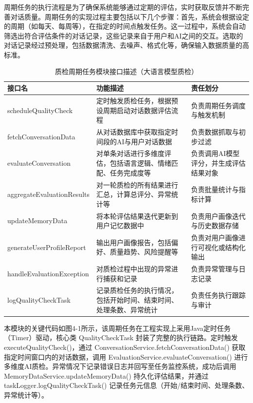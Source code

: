 周期任务的执行流程是为了确保系统能够通过定期的评估，实时获取反馈并不断完善对话质量。周期任务的实现过程主要包括以下几个步骤：首先，系统会根据设定的周期（如每天、每周等），在指定的时间点触发任务。这一过程中，系统会自动筛选出符合评估条件的对话记录，这些记录来自于用户和AI之间的交互。选取的对话记录经过预处理，包括数据清洗、去噪声、格式化等，确保输入数据质量的高标准。
\begin{table}[H]
\centering
\caption{质检周期任务模块接口描述（大语言模型质检）}
\label{tab:periodic-task-interfaces}
{\renewcommand{\arraystretch}{0.7}
\begin{tabular}{p{4cm} p{4cm} p{5cm}}
\hline
接口名 & 功能描述 & 责任划分 \\
\hline
scheduleQualityCheck & 定时触发质检任务，根据预设周期启动对话数据评估流程 & 负责周期任务调度与触发机制 \\
\hline
fetchConversationData & 从对话数据库中获取指定时间段的AI与用户对话数据 & 负责数据抓取与初步过滤 \\
\hline
evaluateConversation & 对单条对话进行多维度评估，包括语言逻辑、情绪匹配、任务完成度等 & 负责调用AI模型评分，并生成评估结果对象 \\
\hline
aggregateEvaluationResults & 对一轮质检的所有结果进行汇总，计算总评分、异常统计等 & 负责批量统计与指标计算 \\
\hline
updateMemoryData & 将本轮评估结果迭代更新到用户记忆数据中 & 负责用户画像迭代与历史数据存储 \\
\hline
generateUserProfileReport & 输出用户画像报告，包括偏好、质量趋势、风险提醒等 & 负责对用户画像进行可视化或结构化输出 \\
\hline
handleEvaluationException & 对质检过程中出现的异常进行捕获和记录 & 负责异常管理与日志记录 \\
\hline
logQualityCheckTask & 记录质检任务的执行情况，包括开始时间、结束时间、处理条数、异常统计 & 负责任务执行跟踪与审计 \\
\hline
\end{tabular}
}
\end{table}


本模块的关键代码如图4-1所示，该周期任务在工程实现上采用Java定时任务（Timer）驱动，核心类 QualityCheckTask 封装了完整的执行链路。定时触发 executeQualityCheck()，通过 ConversationService.fetchConversationData() 获取指定时间窗口内的对话数据，调用 EvaluationService.evaluateConversation() 进行多维度AI质检。异常情况下记录错误日志并回写至任务监控系统，成功后调用 MemoryDataService.updateMemoryData() 持久化评估结果，并通过 taskLogger.logQualityCheckTask() 记录任务元信息（开始/结束时间、处理条数、异常统计等）。

